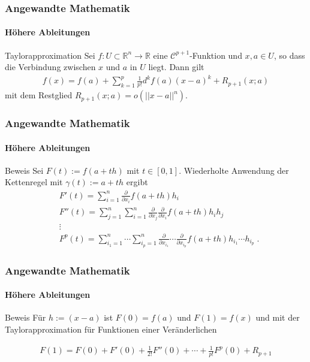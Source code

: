 \documentclass{beamer}
\begin{document}
\begin{frame}
    \frametitle{Angewandte Mathematik}
\framesubtitle{Höhere Ableitungen}
    \begin{block}{Taylorapproximation}
Sei   $f:  U \subset \mathbb{R}^n \to \mathbb{R}$ eine $\mathcal{C}^{p+1}$-Funktion und $x,a \in U$, so dass die Verbindung zwischen $x$ und $a$ in $U$ liegt.
Dann gilt
\begin{align*}
f(x) = f(a) + \sum_{k=1}^{p}\frac{1}{p!} d^k f(a) (x-a)^k + R_{p+1} (x;a)
\end{align*}
mit dem Restglied $R_{p+1} (x;a) =   o(||x - a||^n)$.

\end{block}
 \end{frame}


\begin{frame}
    \frametitle{Angewandte Mathematik}
\framesubtitle{Höhere Ableitungen}
    \begin{block}{Beweis}
Sei $F(t) := f(a + th)$ mit $t \in [0,1]$. Wiederholte Anwendung der Kettenregel mit $\gamma(t) := a +th$ ergibt
\begin{align*}
& F'(t) = \sum_{i=1}^n  \frac{\partial}{\partial x_{i}} f(a + th) h_i \\
& F''(t) =\sum_{j=1}^n \sum_{i=1}^n   \frac{\partial}{\partial x_{j}} \frac{\partial}{\partial x_{i}} f(a + th) h_i h_j \\
& \vdots \\
& F^p(t) =  \sum_{i_1=1}^n  \cdots \sum_{i_p=1}^n   \frac{\partial}{\partial x_{i_1}} \cdots \frac{\partial}{\partial x_{i_p}} f(a + th) h_{i_1} \cdots  h_{i_p}  \; .
\end{align*}
\end{block}
 \end{frame}

\begin{frame}
    \frametitle{Angewandte Mathematik}
\framesubtitle{Höhere Ableitungen}
    \begin{block}{Beweis}
Für $h := (x-a)$  ist $F(0) = f(a)$ und $F(1)= f(x)$ 
und mit der Taylorapproximation für Funktionen einer Veränderlichen  

\begin{align*}
 F(1) = F(0) + F'(0) + \frac{1}{2!} F''(0) + \cdots + \frac{1}{p!} F^p(0) + R_{p+1} 
\end{align*}
\end{block}
 \end{frame}
\end{document}
